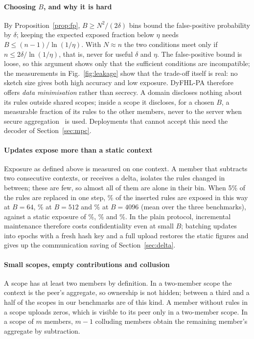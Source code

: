 \documentclass[preprint,12pt]{elsarticle}
\theoremstyle{definition}
\newcommand{\name}{DyFHL-PA\xspace}
\begin{document}
\paragraph{Choosing $B$, and why it is hard} By Proposition~\ref{prop:fp}, $B\ge N^2/(2\delta)$ bins bound the false-positive probability by $\delta$; keeping the expected exposed fraction below $\eta$ needs $B\le(n-1)/\ln(1/\eta)$. With $N\approx n$ the two conditions meet only if $n\le 2\delta/\ln(1/\eta)$, that is, never for useful $\delta$ and $\eta$. The false-positive bound is loose, so this argument shows only that the sufficient conditions are incompatible; the measurements in Fig.~\ref{fig:leakage} show that the trade-off itself is real: no sketch size gives both high accuracy and low exposure. \name therefore offers \emph{data minimisation} rather than secrecy. A domain discloses nothing about its rules outside shared scopes; inside a scope it discloses, for a chosen $B$, a measurable fraction of its rules to the other members, never to the server when secure aggregation~\cite{bonawitz2017practical} is used. Deployments that cannot accept this need the decoder of Section~\ref{sec:mpc}.

\paragraph{Updates expose more than a static context} Exposure as defined above is measured on one context. A member that subtracts two consecutive contexts, or receives a delta, isolates the rules changed in between; these are few, so almost all of them are alone in their bin. When 5\% of the rules are replaced in one step, \rvupdlxiv\% of the inserted rules are exposed in this way at $B=64$, \rvupddxii\% at $B=512$ and \rvupdmmmmxcvi\% at $B=4096$ (mean over the three benchmarks), against a static exposure of \lkallBlxiv\%, \lkallBdxii\% and \lkallBmmmmxcvi\%. In the plain protocol, incremental maintenance therefore costs confidentiality even at small $B$; batching updates into epochs with a fresh hash key and a full upload restores the static figures and gives up the communication saving of Section~\ref{sec:delta}.

\paragraph{Small scopes, empty contributions and collusion} A scope has at least two members by definition. In a two-member scope the context is the peer's aggregate, so ownership is not hidden; between a third and a half of the scopes in our benchmarks are of this kind. A member without rules in a scope uploads zeros, which is visible to its peer only in a two-member scope. In a scope of $m$ members, $m-1$ colluding members obtain the remaining member's aggregate by subtraction.
\end{document}
